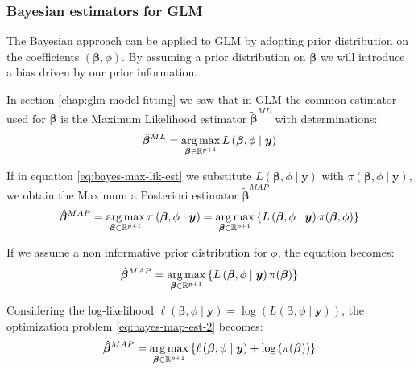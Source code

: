 \documentclass[a4paper, nobind]{templates/ociamthesis}
\theoremstyle{definition}
\theoremstyle{definition}
\theoremstyle{definition}
\theoremstyle{remark}
\begin{document}
\hypertarget{chap:bayes-glm}{%
\subsubsection{Bayesian estimators for GLM}\label{chap:bayes-glm}}

The Bayesian approach can be applied to GLM by adopting prior distribution on the coefficients \((\boldsymbol{\beta}, \phi)\). By assuming a prior distribution on \(\boldsymbol{\beta}\) we will introduce a bias driven by our prior information.

In section \ref{chap:glm-model-fitting} we saw that in GLM the common estimator used for \(\boldsymbol{\beta}\) is the Maximum Likelihood estimator \(\tilde{\boldsymbol{\beta}}^{ML}\) with determinations:
\begin{equation}
\label{eq:bayes-max-lik-est}
\hat{\boldsymbol{\beta}}^{ML} = \operatorname*{arg\,max}_{\boldsymbol{\beta}\in\mathbb{R}^{p+1}}{L\left(\boldsymbol{\beta}, \phi \mid \boldsymbol{y}\right)}
\end{equation}

If in equation \eqref{eq:bayes-max-lik-est} we substitute \(L\left(\boldsymbol{\beta}, \phi \mid \boldsymbol{y}\right)\) with \(\pi\left(\boldsymbol{\beta}, \phi \mid \boldsymbol{y}\right)\), we obtain the Maximum a Posteriori estimator \(\tilde{\boldsymbol{\beta}}^{MAP}\)
\begin{equation}
\label{eq:bayes-map-est-1}
\hat{\boldsymbol{\beta}}^{MAP} = \operatorname*{arg\,max}_{\boldsymbol{\beta}\in\mathbb{R}^{p+1}}{\pi\left(\boldsymbol{\beta}, \phi \mid \boldsymbol{y}\right)}
=
\operatorname*{arg\,max}_{\boldsymbol{\beta}\in\mathbb{R}^{p+1}}{\left\{L\left(\boldsymbol{\beta}, \phi \mid \boldsymbol{y}\right) \pi(\boldsymbol{\beta}, \phi) \right\}}
\end{equation}

If we assume a non informative prior distribution for \(\phi\), the equation becomes:
\begin{equation}
\label{eq:bayes-map-est-2}
\hat{\boldsymbol{\beta}}^{MAP} =
\operatorname*{arg\,max}_{\boldsymbol{\beta}\in\mathbb{R}^{p+1}}{\left\{L\left(\boldsymbol{\beta}, \phi \mid \boldsymbol{y}\right) \pi(\boldsymbol{\beta}) \right\}}
\end{equation}

Considering the log-likelihood \(\ell\left(\boldsymbol{\beta}, \phi \mid \boldsymbol{y}\right) = \log{\left( L\left( \boldsymbol{\beta}, \phi \mid \boldsymbol{y} \right)\right)}\), the optimization problem \eqref{eq:bayes-map-est-2} becomes:
\begin{equation}
\label{eq:bayes-map-est-3}
\hat{\boldsymbol{\beta}}^{MAP} =
\operatorname*{arg\,max}_{\boldsymbol{\beta}\in\mathbb{R}^{p+1}}{\left\{\ell\left(\boldsymbol{\beta}, \phi \mid \boldsymbol{y}\right) + \log{\left(\pi(\boldsymbol{\beta})\right)} \right\}}
\end{equation}
\end{document}
